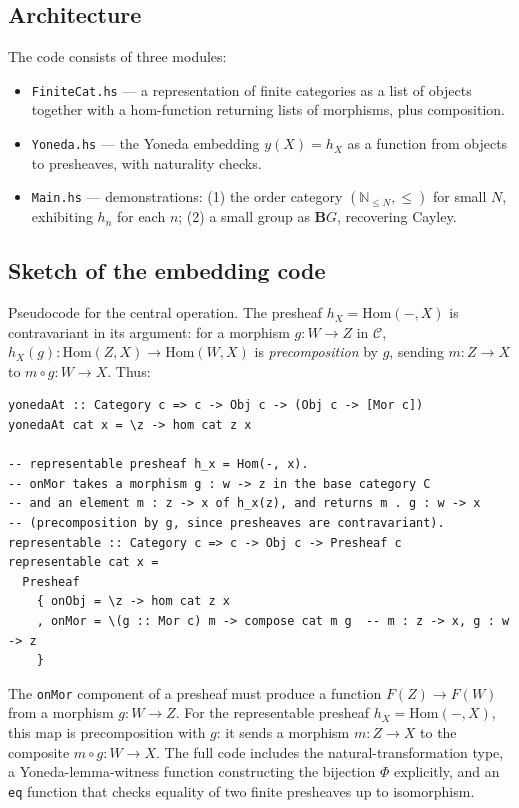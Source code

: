 \documentclass[12pt]{article}
\theoremstyle{definition}
\theoremstyle{remark}
\begin{document}
\subsection{Architecture}

The code consists of three modules:
\begin{itemize}
\item \texttt{FiniteCat.hs} --- a representation of finite categories as a list of objects together with a hom-function returning lists of morphisms, plus composition.
\item \texttt{Yoneda.hs} --- the Yoneda embedding $y(X) = h_X$ as a function from objects to presheaves, with naturality checks.
\item \texttt{Main.hs} --- demonstrations: (1) the order category $(\mathbb{N}_{\le N}, \le)$ for small $N$, exhibiting $h_n$ for each $n$; (2) a small group as $\mathbf{B}G$, recovering Cayley.
\end{itemize}

\subsection{Sketch of the embedding code}

Pseudocode for the central operation. The presheaf $h_X = \mathrm{Hom}(-, X)$ is contravariant in its argument: for a morphism $g\colon W \to Z$ in $\mathcal{C}$, $h_X(g)\colon \mathrm{Hom}(Z, X) \to \mathrm{Hom}(W, X)$ is \emph{precomposition} by $g$, sending $m\colon Z \to X$ to $m \circ g\colon W \to X$. Thus:
\begin{verbatim}
yonedaAt :: Category c => c -> Obj c -> (Obj c -> [Mor c])
yonedaAt cat x = \z -> hom cat z x

-- representable presheaf h_x = Hom(-, x).
-- onMor takes a morphism g : w -> z in the base category C
-- and an element m : z -> x of h_x(z), and returns m . g : w -> x
-- (precomposition by g, since presheaves are contravariant).
representable :: Category c => c -> Obj c -> Presheaf c
representable cat x =
  Presheaf
    { onObj = \z -> hom cat z x
    , onMor = \(g :: Mor c) m -> compose cat m g  -- m : z -> x, g : w -> z
    }
\end{verbatim}
The \texttt{onMor} component of a presheaf must produce a function $F(Z) \to F(W)$ from a morphism $g\colon W \to Z$. For the representable presheaf $h_X = \mathrm{Hom}(-, X)$, this map is precomposition with $g$: it sends a morphism $m\colon Z \to X$ to the composite $m \circ g\colon W \to X$.
The full code includes the natural-transformation type, a Yoneda-lemma-witness function constructing the bijection $\Phi$ explicitly, and an \texttt{eq} function that checks equality of two finite presheaves up to isomorphism.
\end{document}

